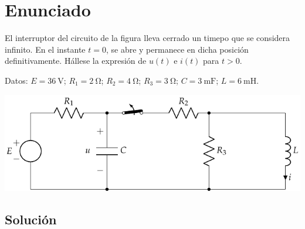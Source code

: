 \section{Enunciado}
El interruptor del circuito de la figura lleva cerrado un timepo que se considera infinito. En el instante $t=0$, se abre y permanece en dicha posición definitivamente. Hállese la expresión de $u(t)$ e $i(t)$ para $t>0$. 

Datos: $E = \qty{36}{\volt}$; $R_1 = \qty{2}{\ohm}$; $R_2 = \qty{4}{\ohm}$; $R_3 = \qty{3}{\ohm}$; $C = \qty{3}{\milli\farad}$; $L = \qty{6}{\milli\henry}$.

\begin{center}
  \includegraphics{figuras/BT4_03.pdf}
\end{center}

\subsection*{Solución}

